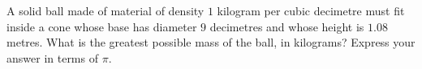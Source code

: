 A solid ball made of material of density $1$ kilogram per cubic decimetre must fit inside a cone whose base has diameter $9$ decimetres and whose height is $1.08$ metres. What is the greatest possible mass of the ball, in kilograms? Express your answer in terms of $\pi$.
